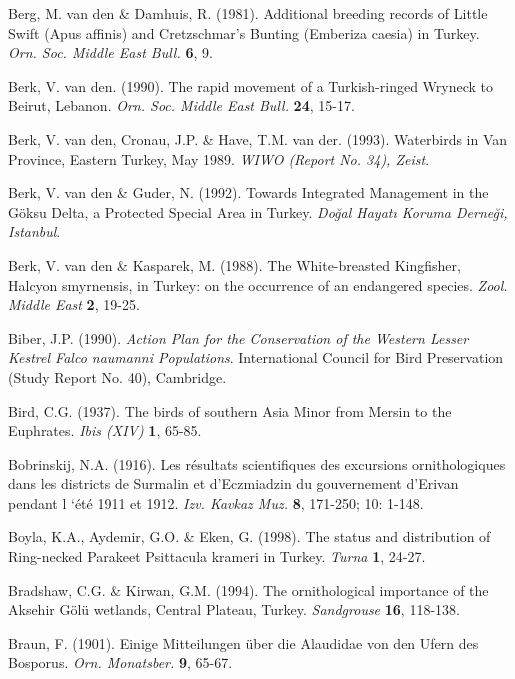 \documentclass[
  10.5pt,
  a4paper,
  DIV=11,
  numbers=noendperiod,
  twocolumn]{scrreprt}
\newlength{\cslhangindent}
\newenvironment{CSLReferences}[2] %
 {\begin{list}{}{%
  \setlength{\itemindent}{0pt}
  \setlength{\leftmargin}{0pt}
  \setlength{\parsep}{0pt}
  \ifodd #1
   \setlength{\leftmargin}{\cslhangindent}
   \setlength{\itemindent}{-1\cslhangindent}
  \fi
  \setlength{\itemsep}{#2\baselineskip}}}
 {\end{list}}
\begin{document}
\begin{CSLReferences}{1}{1}
Berg, M. van den \& Damhuis, R. (1981). {Additional breeding records of
Little Swift ({Apus affinis}) and Cretzschmar's Bunting ({Emberiza
caesia}) in Turkey}. \emph{Orn. Soc. Middle East Bull.} \textbf{6}, 9.

Berk, V. van den. (1990). {The rapid movement of a Turkish-ringed
Wryneck to Beirut, Lebanon}. \emph{Orn. Soc. Middle East Bull.}
\textbf{24}, 15-17.

Berk, V. van den, Cronau, J.P. \& Have, T.M. van der. (1993).
{Waterbirds in Van Province, Eastern Turkey, May 1989}. \emph{WIWO
(Report No. 34), Zeist}.

Berk, V. van den \& Guder, N. (1992). {Towards Integrated Management in
the Göksu Delta, a Protected Special Area in Turkey}. \emph{Doğal Hayatı
Koruma Derneği, Istanbul}.

Berk, V. van den \& Kasparek, M. (1988). {The White-breasted Kingfisher,
{Halcyon smyrnensis}, in Turkey: on the occurrence of an endangered
species}. \emph{Zool. Middle East} \textbf{2}, 19-25.

Biber, J.P. (1990). \emph{{Action Plan for the Conservation of the
Western Lesser Kestrel {Falco naumanni} Populations}}. International
Council for Bird Preservation (Study Report No. 40), Cambridge.

Bird, C.G. (1937). {The birds of southern Asia Minor from Mersin to the
Euphrates}. \emph{Ibis (XIV)} \textbf{1}, 65-85.

Bobrinskij, N.A. (1916). {Les résultats scientifiques des excursions
ornithologiques dans les districts de Surmalin et d'Eczmiadzin du
gouvernement d'Erivan pendant l `été 1911 et 1912}. \emph{Izv. Kavkaz
Muz.} \textbf{8}, 171-250; 10: 1-148.

Boyla, K.A., Aydemir, G.O. \& Eken, G. (1998). {The status and
distribution of Ring-necked Parakeet {Psittacula krameri} in Turkey}.
\emph{Turna} \textbf{1}, 24-27.

Bradshaw, C.G. \& Kirwan, G.M. (1994). {The ornithological importance of
the Aksehir Gölü wetlands, Central Plateau, Turkey}. \emph{Sandgrouse}
\textbf{16}, 118-138.

Braun, F. (1901). {Einige Mitteilungen über die Alaudidae von den Ufern
des Bosporus}. \emph{Orn. Monatsber.} \textbf{9}, 65-67.


\end{CSLReferences}
\end{document}
